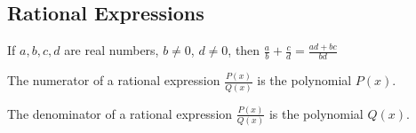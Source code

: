 \documentclass[crop=false,class=book,oneside]{standalone}
\begin{document}
        \subsection{Rational Expressions}
            \begin{theorem}
            \label{theorem:north_shore_cross_multiplying}
            If $a,b,c,d$ are real numbers, $b\ne 0$, $d\ne 0$, then $\frac{a}{b}+\frac{c}{d}=\frac{ad+bc}{bd}$
            \end{theorem}
            \begin{definition}
            \label{definition:north_shore_numerator_of_rational_expression}
            The numerator of a rational expression $\frac{P(x)}{Q(x)}$ is the polynomial $P(x)$.
            \end{definition}
            \begin{definition}
            \label{definition:north_shore_denominator_of_rational_expression}
            The denominator of a rational expression $\frac{P(x)}{Q(x)}$ is the polynomial $Q(x)$.
            \end{definition}
\end{document}
